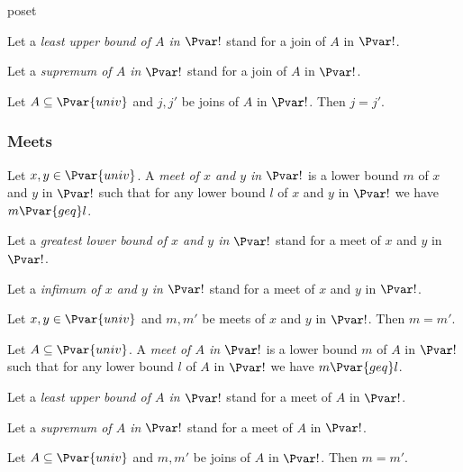 \documentclass{stex}
\begin{document}
\begin{smodule}{poset}
\begin{forthel}
    Let a \emph{least upper bound of $A$ in $\Pvar!$} stand for a join of $A$ in $\Pvar!$.

    Let a \emph{supremum of $A$ in $\Pvar!$} stand for a join of $A$ in $\Pvar!$.

    \begin{proposition*}
      Let $A \subseteq \Pvar{univ}$ and $j, j'$ be joins of $A$ in $\Pvar!$.
      Then $j = j'$.
    \end{proposition*}
  \end{forthel}

  \subsubsection{Meets}

  \begin{forthel}
    \begin{definition*}
      Let $x, y \in \Pvar{univ}$.
      A \emph{meet of $x$ and $y$ in $\Pvar!$} is a lower bound $m$ of $x$ and $y$ in $\Pvar!$ such that for any lower bound $l$ of $x$ and $y$ in $\Pvar!$ we have $m {\Pvar{geq}} l$.
    \end{definition*}

    Let a \emph{greatest lower bound of $x$ and $y$ in $\Pvar!$} stand for a meet of $x$ and $y$ in $\Pvar!$.

    Let a \emph{infimum of $x$ and $y$ in $\Pvar!$} stand for a meet of $x$ and $y$ in $\Pvar!$.

    \begin{proposition*}
      Let $x, y \in \Pvar{univ}$ and $m, m'$ be meets of $x$ and $y$ in $\Pvar!$.
      Then $m = m'$.
    \end{proposition*}
    
    \begin{definition*}
      Let $A \subseteq \Pvar{univ}$.
      A \emph{meet of $A$ in $\Pvar!$} is a lower bound $m$ of $A$ in $\Pvar!$ such that for any lower bound $l$ of $A$ in $\Pvar!$ we have $m {\Pvar{geq}} l$.
    \end{definition*}

    Let a \emph{least upper bound of $A$ in $\Pvar!$} stand for a meet of $A$ in $\Pvar!$.

    Let a \emph{supremum of $A$ in $\Pvar!$} stand for a meet of $A$ in $\Pvar!$.

    \begin{proposition*}
      Let $A \subseteq \Pvar{univ}$ and $m, m'$ be joins of $A$ in $\Pvar!$.
      Then $m = m'$.
    \end{proposition*}
  \end{forthel}


\end{smodule}
\end{document}
